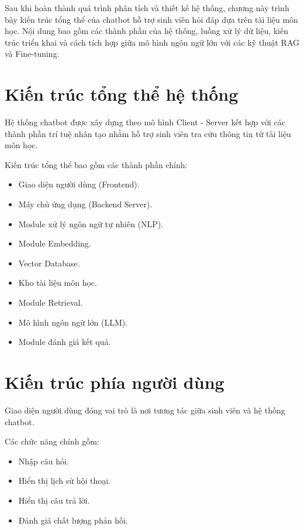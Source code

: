\documentclass[12pt,a4paper]{report}
\begin{document}
	Sau khi hoàn thành quá trình phân tích và thiết kế hệ thống, chương này trình bày kiến trúc tổng thể của chatbot hỗ trợ sinh viên hỏi đáp dựa trên tài liệu môn học. Nội dung bao gồm các thành phần của hệ thống, luồng xử lý dữ liệu, kiến trúc triển khai và cách tích hợp giữa mô hình ngôn ngữ lớn với các kỹ thuật RAG và Fine-tuning.
	
	\section{Kiến trúc tổng thể hệ thống}
	
	Hệ thống chatbot được xây dựng theo mô hình Client - Server kết hợp với các thành phần trí tuệ nhân tạo nhằm hỗ trợ sinh viên tra cứu thông tin từ tài liệu môn học.
	
	Kiến trúc tổng thể bao gồm các thành phần chính:
	
	\begin{itemize}
		\item Giao diện người dùng (Frontend).
		\item Máy chủ ứng dụng (Backend Server).
		\item Module xử lý ngôn ngữ tự nhiên (NLP).
		\item Module Embedding.
		\item Vector Database.
		\item Kho tài liệu môn học.
		\item Module Retrieval.
		\item Mô hình ngôn ngữ lớn (LLM).
		\item Module đánh giá kết quả.
	\end{itemize}
	
	\section{Kiến trúc phía người dùng}
	
	Giao diện người dùng đóng vai trò là nơi tương tác giữa sinh viên và hệ thống chatbot.
	
	Các chức năng chính gồm:
	
	\begin{itemize}
		\item Nhập câu hỏi.
		\item Hiển thị lịch sử hội thoại.
		\item Hiển thị câu trả lời.
		\item Đánh giá chất lượng phản hồi.
	\end{itemize}
	
\end{document}
